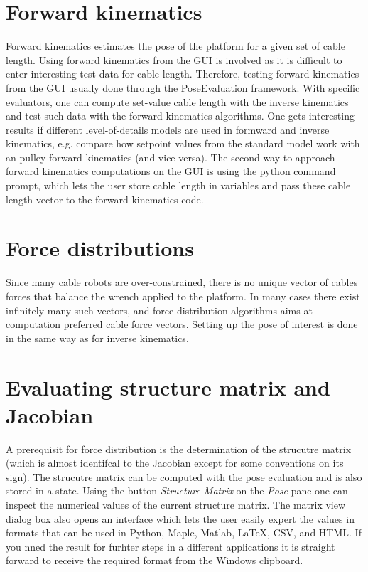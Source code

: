 \documentclass[11pt,a4paper,onepage,openany]{book}
\begin{document}
\section{Forward kinematics}
Forward kinematics estimates the pose of the platform for a given set of cable
length. Using forward kinematics from the GUI is involved as it is difficult
to enter interesting test data for cable length. Therefore, testing forward
kinematics from the GUI usually done through the PoseEvaluation framework. With
specific evaluators, one can compute set-value cable length with the inverse
kinematics and test such data with the forward kinematics algorithms. One gets
interesting results if different level-of-details models are used in formward
and inverse kinematics, e.g. compare how setpoint values from the standard 
model work with an pulley forward kinematics (and vice versa). The second
way to approach forward kinematics computations on the GUI is using the python
command prompt, which lets the user store cable length in variables and pass
these cable length vector to the forward kinematics code. 

\section{Force distributions}
Since many cable robots are over-constrained, there is no unique vector of
cables forces that balance the wrench applied to the platform. In many cases
there exist infinitely many such vectors, and force distribution algorithms
aims at computation preferred cable force vectors. Setting up the pose of
interest is done in the same way as for inverse kinematics.

\section{Evaluating structure matrix and Jacobian}
A prerequisit for force distribution is the determination of the strucutre matrix
(which is almost identifcal to the Jacobian except for some conventions on its sign).
The strucutre matrix can be computed with the pose evaluation and is also stored in a
state. Using the button \emph{Structure Matrix} on the \emph{Pose} pane one can inspect
the numerical values of the current structure matrix. The matrix view dialog box
also opens an interface which lets the user easily expert the values in formats
that can be used in Python, Maple, Matlab, LaTeX, CSV, and HTML. If you nned the
result for furhter steps in a different applications it is straight forward to 
receive the required format from the Windows clipboard.
\end{document}
